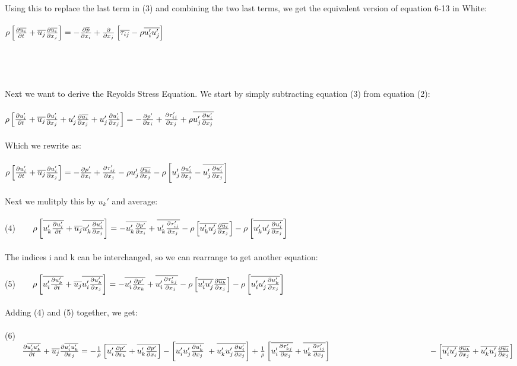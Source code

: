 \documentclass[a4paper,english,11pt,twoside]{article}
\newcommand{\tab}{\hspace*{2em}}
\begin{document}
\\
Using this to replace the last term in (3) and combining the two last terms, we get the equivalent version of equation 6-13 in White:\\
\\
$\rho\left[\frac{\partial \overline{u_i}}{\partial t} + \overline{u_j}\frac{\partial \overline{u_i}}{\partial x_j}\right] = -\frac{\partial \overline{p}}{\partial x_i}+ \frac{\partial }{\partial x_j}\left[\overline{\tau_{ij}} - \rho\overline{u_i' u_j'}\right]$\\
\\
\\
\\
\\
Next we want to derive the Reyolds Stress Equation. We start by simply subtracting equation (3) from equation (2):\\
\\
$\rho\left[\frac{\partial u_i'}{\partial t} + \overline{u_j}\frac{\partial u_i'}{\partial x_j} + u_j'\frac{\partial \overline{u_i}}{\partial x_j} + u_j'\frac{\partial u_i'}{\partial x_j}\right] = -\frac{\partial p'}{\partial x_i} + \frac{\partial \tau_{ij}'}{\partial x_j} + \rho\overline{u_j'\frac{\partial u_i'}{\partial x_j}}$\\
\\
Which we rewrite as:\\
\\
$\rho\left[\frac{\partial u_i'}{\partial t} + \overline{u_j}\frac{\partial u_i'}{\partial x_j}\right] = -\frac{\partial p'}{\partial x_i} + \frac{\partial \tau_{ij}'}{\partial x_j} - \rho u_j'\frac{\partial \overline{u_i}}{\partial x_j} - \rho\left[u_j'\frac{\partial u_i'}{\partial x_j} - \overline{u_j'\frac{\partial u_i'}{\partial x_j}}\right]$\\
\\
Next we mulitply this by $u_k'$ and average:\\
\\
(4)$\tab\rho\left[\ol{u_k'\pdi{u_i'}{t}} + \ol{u_j}\ol{u_k'\pdi{u_i'}{x_j}}\right] = -\ol{u_k'\pdi{p'}{x_i}} + \ol{u_k'\pdi{\tau_{ij}'}{x_j}} - \rho\left[\ol{u_k' u_j'}\pdi{\ol{u_i}}{x_j}\right] - \rho\left[\ol{u_k' u_j'\pdi{u_i'}{x_j}}\right]$\\
\\
The indices i and k can be interchanged, so we can rearrange to get another equation:\\
\\
(5)$\tab\rho\left[\ol{u_i'\pdi{u_k'}{t}} + \ol{u_j}\ol{u_i'\pdi{u_k'}{x_j}}\right] = -\ol{u_i'\pdi{p'}{x_k}} + \ol{u_i'\pdi{\tau_{kj}'}{x_j}} - \rho\left[\ol{u_i' u_j'}\pdi{\ol{u_k}}{x_j}\right] - \rho\left[\ol{u_i' u_j'\pdi{u_k'}{x_j}}\right]$\\
\\
Adding (4) and (5) together, we get:\\
\\
(6)$\tab\pdi{\ol{u_i' u_k'}}{t} + \ol{u_j}\pdi{\ol{u_i' u_k'}}{x_j} = -\frac{1}{\rho}\left[\ol{u_i'\pdi{p'}{x_k}} + \ol{u_k'\pdi{p'}{x_i}}\right] - \left[\ol{u_i' u_j'\pdi{u_k'}{x_j}}\ + \ol{u_k' u_j'\pdi{u_i'}{x_j}}\right] + \frac{1}{\rho}\left[\ol{u_i'\pdi{\tau_{kj}'}{x_j}} + \ol{u_k'\pdi{\tau_{ij}'}{x_j}}\right]\\\\\tab\tab\tab\tab\tab\tab - \left[\ol{u_i' u_j'}\pdi{\ol{u_k}}{x_j} + \ol{u_k' u_j'}\pdi{\ol{u_i}}{x_j}\right]$\\
\end{document}
